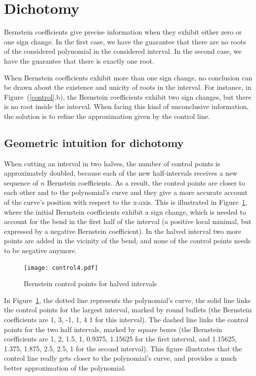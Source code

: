 \documentclass{mscs}
\begin{document}
\section{Dichotomy}

\label{sec:dicho}
Bernstein coefficients give precise information when they exhibit
either zero or one sign change. In the first case, we have the
guarantee that there are no roots of the considered polynomial in the
considered interval. In the second case, we have the guarantee that
there is exactly one root.

When Bernstein coefficients exhibit more than one sign change, no
conclusion can be drawn about the existence and unicity of roots in the
interval.  For instance, in Figure~(\ref{control}.b), the Bernstein
coefficients exhibit two sign changes, but there is no root inside the
interval.  When facing this kind of unconclusive information, the solution
is to refine the approximation given by the control line.

\subsection{Geometric intuition for dichotomy}
\label{ssec:dichogeom}
When cutting an interval in two halves, the number of control points is
approximately doubled, because each of the new half-intervals receives a
new sequence of \(n\) Bernstein coefficients.  As a result, the control points
are closer to each other and to the polynomial's curve and they give a more
accurate account of the curve's position with respect to the x-axis.  This is
illustrated in Figure~\ref{dichotomy-curve}, where the initial Bernstein
coefficients exhibit a sign change, which is needed to account for the bend
in the first half of the interval (a positive local minimal, but expressed
by a negative Bernstein coefficient).  In the halved interval two more points
are added in the vicinity of the bend, and none of the control points needs
to be negative anymore.
\begin{figure}
\begin{center}
\texttt{[image: control4.pdf]}
\caption{\label{dichotomy-curve}Bernstein control points for halved intervals}
\end{center}
\end{figure}

In Figure~\ref{dichotomy-curve}, the dotted line represents
the polynomial's curve, the solid line links the control points for
the largest interval, marked by round bullets (the Bernstein coefficients are
1, 3, -1, 1, 4 1 for this interval).  The dashed line links the control points
for the two half intervals, marked by square boxes
(the Bernstein coefficients are 1, 2, 1.5, 1,
0.9375, 1.15625 for the first interval, and 1.15625, 1.375, 1.875, 2.5, 2.5,
1 for the second interval).  This figure illustrates that the control line
really gets closer to the polynomial's curve, and provides a much better
approximation of the polynomial.
\end{document}
